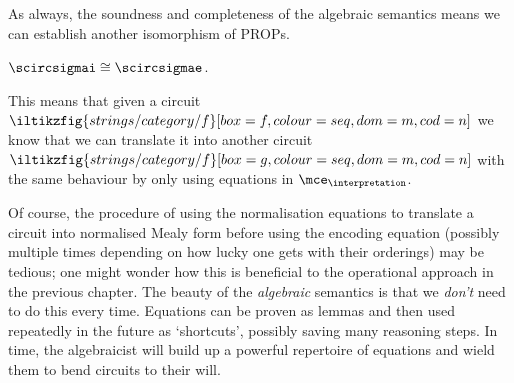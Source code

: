 As always, the soundness and completeness of the algebraic semantics means we
can establish another isomorphism of PROPs.

\begin{corollary}
    \(\scircsigmai \cong \scircsigmae\).
\end{corollary}

This means that given a circuit \(
\iltikzfig{strings/category/f}[box=f,colour=seq,dom=m,cod=n]
\) we know that we can translate it into another circuit \(
\iltikzfig{strings/category/f}[box=g,colour=seq,dom=m,cod=n]
\) with the same behaviour by only using equations in \(\mce_\interpretation\).

Of course, the procedure of using the normalisation equations to translate a
circuit into normalised Mealy form before using the encoding equation (possibly
multiple times depending on how lucky one gets with their orderings) may be
tedious; one might wonder how this is beneficial to the operational approach in
the previous chapter.
The beauty of the \emph{algebraic} semantics is that we \emph{don't} need to
do this every time.
Equations can be proven as lemmas and then used repeatedly in the future as
`shortcuts', possibly saving many reasoning steps.
In time, the algebraicist will build up a powerful repertoire of equations and
wield them to bend circuits to their will.